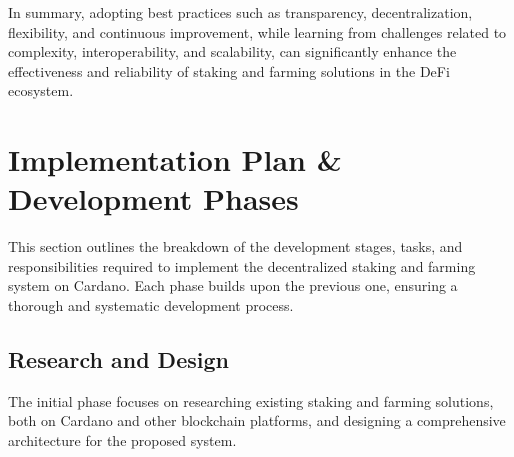 \documentclass[12pt,parskip=full, tikz]{article}
\begin{document}
In summary, adopting best practices such as transparency, decentralization, flexibility, and continuous improvement, while learning from challenges related to complexity, interoperability, and scalability, can significantly enhance the effectiveness and reliability of staking and farming solutions in the DeFi ecosystem.







\section{Implementation Plan \& Development Phases}
This section outlines the breakdown of the development stages, tasks, and responsibilities required to implement the decentralized staking and farming system on Cardano. Each phase builds upon the previous one, ensuring a thorough and systematic development process.

\subsection{Research and Design}
The initial phase focuses on researching existing staking and farming solutions, both on Cardano and other blockchain platforms, and designing a comprehensive architecture for the proposed system. 
\end{document}
